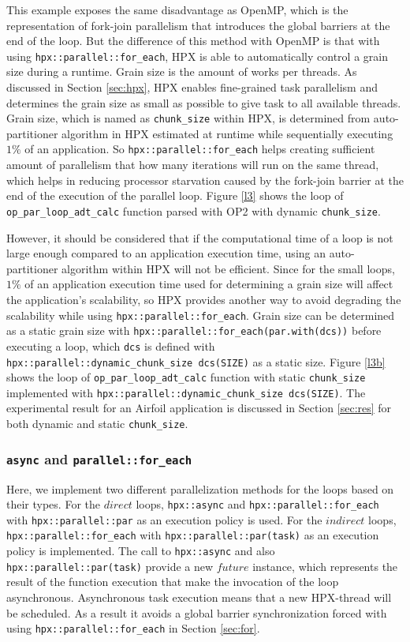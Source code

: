 \documentclass[conference]{IEEEtran}
\begin{document}
This example exposes the same disadvantage as OpenMP, which is the representation of fork-join parallelism that introduces the global barriers at the end of the loop. But the difference of this method with OpenMP is that with using \texttt{hpx::parallel::for\_each}, HPX is able to automatically control a grain size during a runtime. Grain size is the amount of works per threads. As discussed in Section \ref{sec:hpx}, HPX enables fine-grained task parallelism and determines the grain size as small as possible to give task to all available threads. Grain size, which is named as \texttt{chunk\_size} within HPX, is determined from auto-partitioner algorithm in HPX estimated at runtime while sequentially executing $1\%$ of an application. So \texttt{hpx::parallel::for\_each} helps creating sufficient amount of parallelism that how many iterations will run on the same thread, which helps in reducing processor starvation caused by the fork-join barrier at the end of the execution of the parallel loop.  Figure \ref{l3} shows the loop of \texttt{op\_par\_loop\_adt\_calc} function parsed with OP2 with dynamic \texttt{chunk\_size}. 

However, it should be considered that if the computational time of a loop is not large enough compared to an application execution time, using an auto-partitioner algorithm within HPX will not be efficient. Since for the small loops, $1\%$ of an application execution time used for determining a grain size will affect the application's scalability, so HPX provides another way to avoid degrading the scalability while using \texttt{hpx::parallel::for\_each}. Grain size can be determined as a static grain size with \texttt{hpx::parallel::for\_each(par.with(dcs))} before executing a loop, which \texttt{dcs} is defined with \texttt{hpx::parallel::dynamic\_chunk\_size dcs(SIZE)} as a static size.  Figure \ref{l3b} shows the loop of \texttt{op\_par\_loop\_adt\_calc} function with static \texttt{chunk\_size} implemented with \texttt{hpx::parallel::dynamic\_chunk\_size dcs(SIZE)}. The experimental result for an Airfoil application is discussed in Section \ref{sec:res} for both dynamic and static \texttt{chunk\_size}.

\subsubsection{\textbf{\texttt{async} and \texttt{parallel::for\_each}}}
\label{sec:async}

Here, we implement two different parallelization methods for the loops based on their types. For the $direct$ loops, \texttt{hpx::async} and \texttt{hpx::parallel::for\_each} with \texttt{hpx::parallel::par} as an execution policy is used. For  the $indirect$ loops,  \texttt{hpx::parallel::for\_each} with \texttt{hpx::parallel::par(task)} as an execution policy is implemented. The call to \texttt{hpx::async} and also \texttt{hpx::parallel::par(task)} provide a new $future$ instance, which represents the result of the function execution that make the invocation of the loop asynchronous. Asynchronous task execution means that a new HPX-thread will be scheduled. As a result it avoids a global barrier synchronization forced with using \texttt{hpx::parallel::for\_each} in Section \ref{sec:for}.
\end{document}
